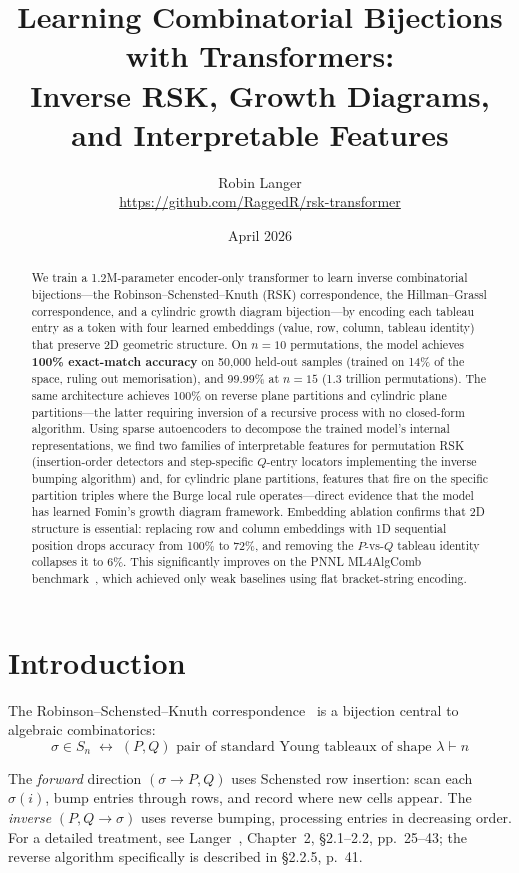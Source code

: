 \documentclass[11pt,a4paper]{article}
\title{\textbf{Learning Combinatorial Bijections with Transformers:\\Inverse RSK, Growth Diagrams, and Interpretable Features}}
\author{Robin Langer\\[4pt]
\small \url{https://github.com/RaggedR/rsk-transformer}}
\date{April 2026}
\begin{document}
\maketitle

\begin{abstract}
We train a 1.2M-parameter encoder-only transformer to learn inverse combinatorial bijections---the Robinson--Schensted--Knuth (RSK) correspondence, the Hillman--Grassl correspondence, and a cylindric growth diagram bijection---by encoding each tableau entry as a token with four learned embeddings (value, row, column, tableau identity) that preserve 2D geometric structure. On $n{=}10$ permutations, the model achieves \textbf{100\% exact-match accuracy} on 50,000 held-out samples (trained on 14\% of the space, ruling out memorisation), and 99.99\% at $n{=}15$ (1.3 trillion permutations). The same architecture achieves 100\% on reverse plane partitions and cylindric plane partitions---the latter requiring inversion of a recursive process with no closed-form algorithm. Using sparse autoencoders to decompose the trained model's internal representations, we find two families of interpretable features for permutation RSK (insertion-order detectors and step-specific $Q$-entry locators implementing the inverse bumping algorithm) and, for cylindric plane partitions, features that fire on the specific partition triples where the Burge local rule operates---direct evidence that the model has learned Fomin's growth diagram framework. Embedding ablation confirms that 2D structure is essential: replacing row and column embeddings with 1D sequential position drops accuracy from 100\% to 72\%, and removing the $P$-vs-$Q$ tableau identity collapses it to 6\%. This significantly improves on the PNNL ML4AlgComb benchmark~\cite{pnnl}, which achieved only weak baselines using flat bracket-string encoding.
\end{abstract}

\section{Introduction}

The Robinson--Schensted--Knuth correspondence~\cite{knuth1970,schensted1961} is a bijection central to algebraic combinatorics:
\[
\sigma \in S_n \;\longleftrightarrow\; (P, Q) \text{ pair of standard Young tableaux of shape } \lambda \vdash n
\]

The \emph{forward} direction $(\sigma \to P, Q)$ uses Schensted row insertion: scan each $\sigma(i)$, bump entries through rows, and record where new cells appear. The \emph{inverse} $(P, Q \to \sigma)$ uses reverse bumping, processing entries in decreasing order. For a detailed treatment, see Langer~\cite{langer2013}, Chapter~2, \S2.1--2.2, pp.~25--43; the reverse algorithm specifically is described in \S2.2.5, p.~41.
\end{document}
